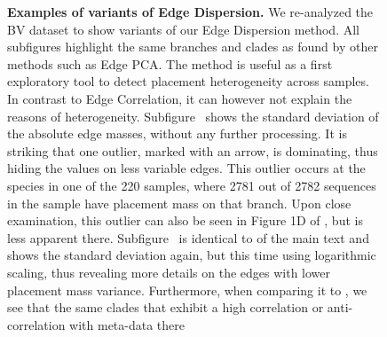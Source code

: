 \begin{figure}[!ht]
    \centering
    \begin{subfigure}{0pt}
        \label{fig:all_dispersions:sub:em_var}
    \end{subfigure}
    \begin{subfigure}{0pt}
        \label{fig:all_dispersions:sub:em_varc}
    \end{subfigure}
    \begin{subfigure}{0pt}
        \label{fig:all_dispersions:sub:em_iod}
    \end{subfigure}
    \begin{subfigure}{0pt}
        \label{fig:all_dispersions:sub:ei_var}
    \end{subfigure}
    \caption[Examples of variants of Edge Dispersion]{
        \textbf{Examples of variants of Edge Dispersion.}
        We re-analyzed the \ac{BV} dataset to show variants of our Edge Dispersion method.
        All subfigures highlight the same branches and clades as found by other methods such as Edge PCA.
        The method is useful as a first exploratory tool to detect placement heterogeneity across samples.
        In contrast to Edge Correlation, it can however not explain the reasons of heterogeneity.
        Subfigure~
        shows the standard deviation of the absolute edge masses, without any further processing.
        It is striking that one outlier, marked with an arrow, is dominating,
        thus hiding the values on less variable edges.
        This outlier occurs at the species  in one of the \num{220} samples,
        where \num{2 781} out of \num{2 782} sequences in the sample have placement mass on that branch.
        Upon close examination, this outlier can also be seen in Figure 1D of \cite{Srinivasan2012},
        but is less apparent there.
        Subfigure~
        is identical to  of the main text
        and shows the standard deviation again, but this time using logarithmic scaling,
        thus revealing more details on the edges with lower placement mass variance.
        Furthermore, when comparing it to ,
        we see that the same clades that exhibit a high correlation or anti-correlation with meta-data there
}
\end{figure}
